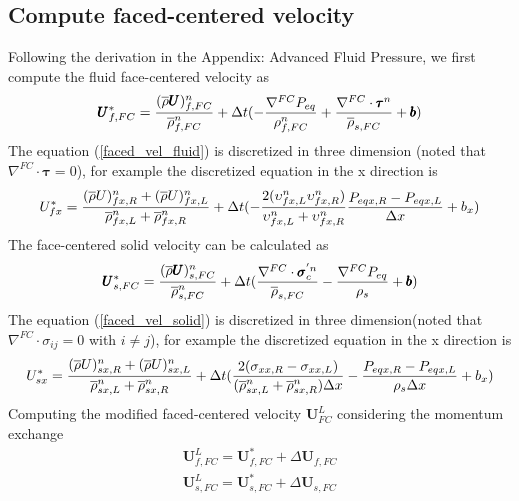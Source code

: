 \documentclass[preprint,12pt]{elsarticle}
\begin{document}
\subsection{\textsf{Compute faced-centered velocity}}
Following the derivation in the Appendix: Advanced Fluid Pressure, we first compute the fluid face-centered velocity as\\
%
%
\begin{equation}
\label{faced_vel_fluid}
    \pmb{U}_{f,FC}^{*} = \frac{(\overline{\rho} \pmb{U})_{f,FC}^n}{\overline{\rho}_{f,FC}^n} + \Delta{t} (-\frac{\nabla^{FC} P_{eq}}{\rho_{f,FC}^n}  +\frac{\nabla^{FC} \cdot \pmb{\tau}^{n}}{\overline{\rho}_{s,FC}}+ \pmb{b})
\end{equation}
%
%
The equation (\ref{faced_vel_fluid}) is discretized in three dimension (noted that $\nabla^{FC} \cdot \pmb{\tau} = 0$), for example the discretized equation in the x direction is
%
\begin{equation}
U_{fx}^{*} = \frac{(\overline{\rho} U)_{fx,R}^n + (\overline{\rho} U)_{fx,L}^n}{\overline{\rho}_{fx,L}^n + \overline{\rho}_{fx,R}^n} + \Delta{t} (-\frac{2(\upsilon_{fx,L}^n \upsilon_{fx,R}^n)}{\upsilon_{fx,L}^n + \upsilon_{fx,R}^n} \frac{P_{eqx,R} - P_{eqx,L}}{\Delta x} + b_x)
\end{equation}
%
%
The face-centered solid velocity can be calculated as
\begin{equation}
\label{faced_vel_solid}
\pmb{U}_{s,FC}^{*} = \frac{(\overline{\rho} \pmb{U})_{s,FC}^n}{\overline{\rho}_{s,FC}^n} + \Delta{t} ( \frac{\nabla^{FC} \cdot \pmb{\sigma}_c^{'n}}{\overline{\rho}_{s,FC}}    - \frac{\nabla^{FC} P_{eq}}{\rho_s}   + \pmb{b})
\end{equation}
The equation (\ref{faced_vel_solid}) is discretized in three dimension(noted that $\nabla^{FC} \cdot \sigma_{ij} = 0$ with $i \neq j$), for example the discretized equation in the x direction is
%
\begin{equation}
U_{sx}^{*} = \frac{(\overline{\rho} U)_{sx,R}^n + (\overline{\rho} U)_{sx,L}^n}{\overline{\rho}_{sx,L}^n + \overline{\rho}_{sx,R}^n} + \Delta{t} (\frac{2(\sigma_{xx,R} - \sigma_{xx,L})}{(\overline{\rho}_{sx,L}^n + \overline{\rho}_{sx,R}^n)\Delta x}-\frac{P_{eqx,R} - P_{eqx,L}}{\rho_s \Delta x} + b_x)
\end{equation}
%
%
Computing the modified faced-centered velocity $\pmb{U}_{FC}^{L}$ considering the momentum exchange
%
\begin{equation}
\begin{gathered}
   \pmb{U}_{f,FC}^{L} = \pmb{U}_{f,FC}^{*} + \Delta \pmb{U}_{f,FC}\\
   \pmb{U}_{s,FC}^{L} = \pmb{U}_{s,FC}^{*} + \Delta \pmb{U}_{s,FC}
\end{gathered}
\end{equation}
\end{document}
